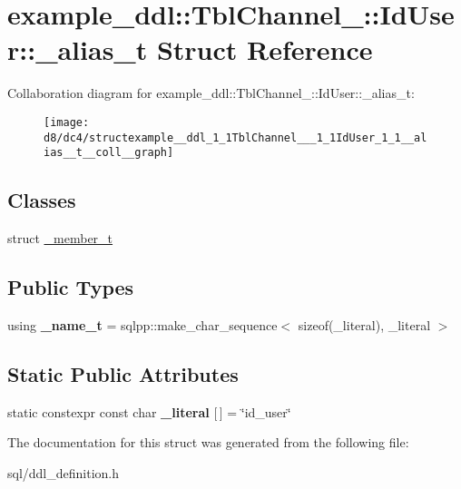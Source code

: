 \hypertarget{structexample__ddl_1_1TblChannel___1_1IdUser_1_1__alias__t}{}\section{example\+\_\+ddl\+:\+:Tbl\+Channel\+\_\+\+:\+:Id\+User\+:\+:\+\_\+alias\+\_\+t Struct Reference}
\label{structexample__ddl_1_1TblChannel___1_1IdUser_1_1__alias__t}


Collaboration diagram for example\+\_\+ddl\+:\+:Tbl\+Channel\+\_\+\+:\+:Id\+User\+:\+:\+\_\+alias\+\_\+t\+:
\nopagebreak
\begin{figure}[H]
\begin{center}
\leavevmode
\texttt{[image: d8/dc4/structexample\_\_ddl\_1\_1TblChannel\_\_\_1\_1IdUser\_1\_1\_\_alias\_\_t\_\_coll\_\_graph]}
\end{center}
\end{figure}
\subsection*{Classes}
\begin{DoxyCompactItemize}
\item 
struct \hyperlink{structexample__ddl_1_1TblChannel___1_1IdUser_1_1__alias__t_1_1__member__t}{\+\_\+member\+\_\+t}
\end{DoxyCompactItemize}
\subsection*{Public Types}
\begin{DoxyCompactItemize}
\item 
\hypertarget{structexample__ddl_1_1TblChannel___1_1IdUser_1_1__alias__t_ab9d0ab79dfbf2812bc9b95885a9538a0}{}using {\bfseries \+\_\+name\+\_\+t} = sqlpp\+::make\+\_\+char\+\_\+sequence$<$ sizeof(\+\_\+literal), \+\_\+literal $>$\label{structexample__ddl_1_1TblChannel___1_1IdUser_1_1__alias__t_ab9d0ab79dfbf2812bc9b95885a9538a0}

\end{DoxyCompactItemize}
\subsection*{Static Public Attributes}
\begin{DoxyCompactItemize}
\item 
\hypertarget{structexample__ddl_1_1TblChannel___1_1IdUser_1_1__alias__t_ae92c801137ef3b4ac37a7eebbd45c365}{}static constexpr const char {\bfseries \+\_\+literal} \mbox{[}$\,$\mbox{]} = \char`\"{}id\+\_\+user\char`\"{}\label{structexample__ddl_1_1TblChannel___1_1IdUser_1_1__alias__t_ae92c801137ef3b4ac37a7eebbd45c365}

\end{DoxyCompactItemize}


The documentation for this struct was generated from the following file\+:\begin{DoxyCompactItemize}
\item 
sql/ddl\+\_\+definition.\+h\end{DoxyCompactItemize}
